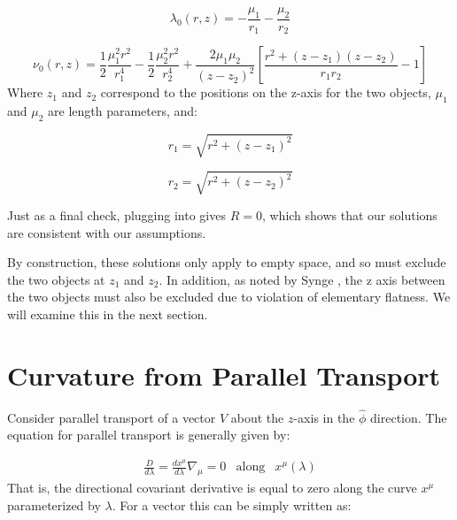 \documentclass{article}
\begin{document}
\begin{equation}
\lambda_0(r,z)=-\frac{\mu_1}{r_1}-\frac{\mu_2}{r_2}
\label{eq:lambda-0}
\end{equation}

\begin{equation}
	\label{eq:nu-0}
	\nu_0(r,z)=\frac{1}{2}\frac{\mu_{1}^{2}r^2}{r_{1}^{4}}-\frac{1}{2}\frac{\mu_{2}^{2}r^2}{r_{2}^{4}}+\frac{2\mu_1\mu_2}{(z-z_2)^2}\left[\frac{r^2+(z-z_1)(z-z_2)}{r_{1}r_{2}}-1\right]
\end{equation}
Where $z_1$ and $z_2$ correspond to the positions on the z-axis for the two objects, $\mu_1$ and $\mu_2$ are length parameters, and:

\begin{equation}
r_1=\sqrt{r^2+(z-z_1)^2}
\label{eq:r_1}
\end{equation}

\begin{equation}
r_2=\sqrt{r^2+(z-z_2)^2}
\label{eq:r_2}
\end{equation}

Just as a final check, plugging  into  gives $R=0$, which shows that our solutions are consistent with our assumptions.

By construction, these solutions only apply to empty space, and so must exclude the two objects at $z_1$ and $z_2$. In addition, as noted by Synge \cite{synge_relativity}, the z axis between the two objects must also be excluded due to violation of elementary flatness. We will examine this in the next section.

\section{Curvature from Parallel Transport}

Consider parallel transport of a vector $V$ about the $z$-axis in
the $\hat{\phi}$ direction. The equation for parallel transport is generally given by:
  	
\begin{equation}
\begin{array}{rcl} \frac{D}{d\lambda}=\frac{dx^{\mu}}{d\lambda}\nabla_{\mu}=0 & \mbox{along} & x^{\mu}\left(\lambda\right)	  	
\end{array}
\end{equation}	  	
That is, the directional covariant derivative is equal to zero along
the curve $x^{\mu}$ parameterized by $\lambda$. For a vector this can
be simply written as:
\end{document}
